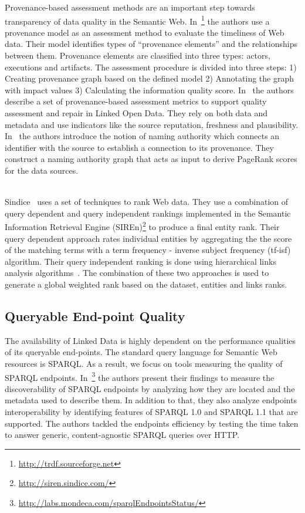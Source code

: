 Provenance-based assessment methods are an important step towards transparency of data quality in the Semantic Web. In~\cite{Hartig:ISWC:09}\footnote{\url{http://trdf.sourceforge.net}} the authors use a provenance model as an assessment method to evaluate the timeliness of Web data. Their model identifies types of ``provenance elements'' and the relationships between them. Provenance elements are classified into three types: actors, executions and artifacts. The assessment procedure is divided into three steps: 1) Creating provenance graph based on the defined model 2) Annotating the graph with impact values 3) Calculating the information quality score. In~\cite{Flouris:EvoDyn:12} the authors describe a set of provenance-based assessment metrics to support quality assessment and repair in Linked Open Data. They rely on both data and metadata and use indicators like the source reputation, freshness and plausibility. In~\cite{Harth:ISWC:09} the authors introduce the notion of naming authority which connects an identifier with the source to establish a connection to its provenance. They construct a naming authority graph that acts as input to derive PageRank scores for the data sources.

\\

Sindice~\cite{Tummarello:ISWC:07} uses a set of techniques to rank Web data. They use a combination of query dependent and query independent rankings implemented in the Semantic Information Retrieval Engine (SIREn)\footnote{\url{http://siren.sindice.com/}} to produce a final entity rank. Their query dependent approach rates individual entities by aggregating the the score of the matching terms with a term frequency - inverse subject frequency (tf-isf) algorithm. Their query independent ranking is done using hierarchical links analysis algorithms~\cite{Delbru:ESWC:10}. The combination of these two approaches is used to generate a global weighted rank based on the dataset, entities and links ranks.

\subsection{Queryable End-point Quality}
The availability of Linked Data is highly dependent on the performance qualities of its queryable end-points. The standard query language for Semantic Web resources is SPARQL. As a result, we focus on tools measuring the quality of SPARQL endpoints. In~\cite{BuilAranda:ISWC:13}\footnote{\url{http://labs.mondeca.com/sparqlEndpointsStatus/}} the authors present their findings to measure the discoverability of SPARQL endpoints by analyzing how they are located and the metadata used to describe them. In addition to that, they also analyze endpoints interoperability by identifying features of SPARQL 1.0 and SPARQL 1.1 that are supported. The authors tackled the endpoints efficiency by testing the time taken to answer generic, content-agnostic SPARQL queries over HTTP.


